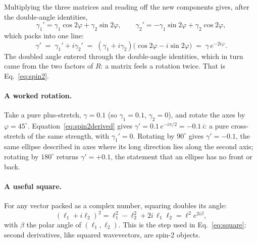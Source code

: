 \documentclass[11pt]{article}
\numberwithin{equation}{section}
\begin{document}
Multiplying the three matrices and reading off the new components
gives, after the double-angle identities,
\begin{equation}
  \gamma_1' = \gamma_1 \cos 2\varphi + \gamma_2 \sin 2\varphi ,
  \qquad
  \gamma_2' = -\gamma_1 \sin 2\varphi + \gamma_2 \cos 2\varphi ,
  \label{eq:spin2components}
\end{equation}
which packs into one line:
\begin{equation}
  \gamma' \;=\; \gamma_1' + i\gamma_2'
  \;=\; (\gamma_1 + i\gamma_2)
  \bigl(\cos 2\varphi - i \sin 2\varphi\bigr)
  \;=\; \gamma\, e^{-2i\varphi} .
  \label{eq:spin2derived}
\end{equation}
The doubled angle entered through the double-angle identities, which
in turn came from the two factors of $R$: a matrix feels a rotation
twice.  That is Eq.~\eqref{eq:spin2}.

\paragraph{A worked rotation.}
Take a pure plus-stretch, $\gamma = 0.1$ (so $\gamma_1 = 0.1$,
$\gamma_2 = 0$), and rotate the axes by $\varphi = 45^\circ$.
Equation~\eqref{eq:spin2derived} gives
$\gamma' = 0.1\, e^{-i\pi/2} = -0.1\,i$: a pure cross-stretch of the
same strength, with $\gamma_1' = 0$.  Rotating by $90^\circ$ gives
$\gamma' = -0.1$, the same ellipse described in axes where its long
direction lies along the second axis; rotating by $180^\circ$
returns $\gamma' = +0.1$, the statement that an ellipse has no
front or back.

\paragraph{A useful square.}
For any vector packed as a complex number, squaring doubles its
angle:
\begin{equation}
  (\ell_1 + i\ell_2)^2
  = \ell_1^2 - \ell_2^2 + 2i\,\ell_1\ell_2
  = \ell^2 e^{2i\beta} ,
  \label{eq:squareapp}
\end{equation}
with $\beta$ the polar angle of $(\ell_1, \ell_2)$.  This is the
step used in Eq.~\eqref{eq:square}: second derivatives, like
squared wavevectors, are spin-2 objects.
\end{document}
